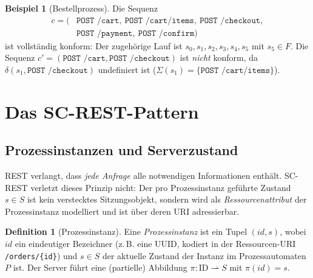 ﻿\documentclass[a4paper,12pt]{article}
\theoremstyle{definition}
\newtheorem{definition}{Definition}
\newtheorem{beispiel}{Beispiel}
\begin{document}
\begin{beispiel}[Bestellprozess]
	Die Sequenz
	\[
		\begin{aligned}
			c = (&\texttt{POST /cart},\ \texttt{POST /cart/items},\ \texttt{POST /checkout},\\
			     &\texttt{POST /payment},\ \texttt{POST /confirm})
		\end{aligned}
	\]
	ist vollständig konform: Der zugehörige Lauf ist $s_0, s_1, s_2, s_3, s_4, s_5$ mit
	$s_5 \in F$. Die Sequenz $c' = (\texttt{POST /cart}, \texttt{POST /checkout})$ ist
	\emph{nicht} konform, da $\delta(s_1, \texttt{POST /checkout})$ undefiniert ist
	($\Sigma(s_1) = \{\texttt{POST /cart/items}\}$).
\end{beispiel}

\section{Das SC-REST-Pattern}
\label{sec:pattern}

\subsection{Prozessinstanzen und Serverzustand}

REST verlangt, dass \emph{jede Anfrage} alle notwendigen Informationen enthält. SC-REST
verletzt dieses Prinzip nicht: Der pro Prozessinstanz geführte Zustand $s \in S$ ist kein
verstecktes Sitzungsobjekt, sondern wird als \emph{Ressourcenattribut} der Prozessinstanz
modelliert und ist über deren URI adressierbar.

\begin{definition}[Prozessinstanz]
	\label{def:prozessinstanz}
	Eine \emph{Prozessinstanz} ist ein Tupel $(id, s)$, wobei $id$ ein eindeutiger
	Bezeichner (z.\,B. eine UUID, kodiert in der Ressourcen-URI
	\texttt{/orders/\{id\}}) und $s \in S$ der aktuelle Zustand der Instanz im
	Prozessautomaten $P$ ist. Der Server führt eine (partielle) Abbildung
	$\pi: \text{ID} \rightharpoonup S$ mit $\pi(id) = s$.
\end{definition}
\end{document}

